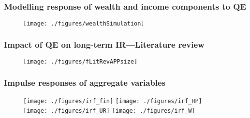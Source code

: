 \documentclass[pdflatex,aspectratio=169]{beamer}
\begin{document}
\begin{frame}\frametitle{\bf Modelling response of wealth and income components to QE \hypertarget{DetailedWealth}{}
\hyperlink{WealthSim}{}
}

\begin{figure}
\begin{center}
\texttt{[image: ./figures/wealthSimulation]}
\end{center}
\end{figure}

\end{frame}



\begin{frame}\frametitle{\bf Impact of QE on long-term IR---Literature review}
\begin{figure}
\begin{center}
\texttt{[image: ./figures/fLitRevAPPsize]}
\end{center}
\end{figure}

\end{frame}



\begin{frame}\frametitle{\bf Impulse responses of aggregate variables}
\begin{figure}
\begin{center}
\texttt{[image: ./figures/irf\_fin]}
\texttt{[image: ./figures/irf\_HP]}\\
\texttt{[image: ./figures/irf\_UR]}
\texttt{[image: ./figures/irf\_W]}
\end{center}
\end{figure}

\end{frame}


\begin{comment}
\begin{frame}\frametitle{\bf Impulse responses 4 quarters after shock}
Substantial heterogeneity across countries
\begin{figure}
\begin{center}
\texttt{[image: ./figures/figureIRFs\_cut1Y\_all]}
\end{center}
\end{figure}

\end{frame}
\end{comment}
\end{document}
